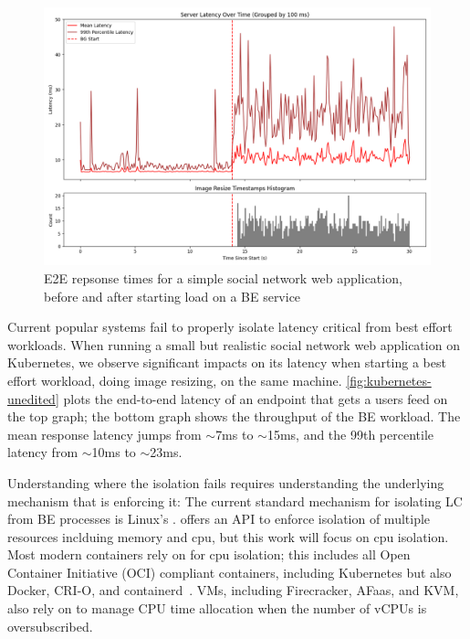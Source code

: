 \begin{figure}[t]
    \centering
    \includegraphics[width=\columnwidth]{graphs/kubernetes-unedited.png}
    \caption{E2E repsonse times for a simple social network web application,
    before and after starting load on a BE
    service}\label{fig:kubernetes-unedited}
\end{figure}

Current popular systems fail to properly isolate latency critical from best
effort workloads. When running a small but realistic social network web
application on Kubernetes, we observe significant impacts on its latency when
starting a best effort workload, doing image resizing, on the same machine.
\autoref{fig:kubernetes-unedited} plots the end-to-end latency of an endpoint
that gets a users feed on the top graph; the bottom graph shows the throughput
of the BE workload. The mean response latency jumps from $\sim$7ms to
$\sim$15ms, and the 99th percentile latency from $\sim$10ms to $\sim$23ms. 

Understanding where the isolation fails requires understanding the underlying
mechanism that is enforcing it: The current standard mechanism for isolating LC
from BE processes is Linux's \cgroups{}. \cgroups{} offers an API to enforce
isolation of multiple resources inclduing memory and cpu, but this work will
focus on cpu isolation. Most modern containers rely on \cgroups{} for cpu
isolation; this includes all Open Container Initiative (OCI) compliant
containers, including Kubernetes but also Docker, CRI-O, and
containerd~\cite{oci-cgroups,docker-docs-cgroups,container-isolation-article}.
VMs, including Firecracker, AFaas, and KVM, also rely on \cgroups{} to manage
CPU time allocation when the number of vCPUs is
oversubscribed.~\cite{kvm-cgroups, firecracker-cgroups,afaas}

